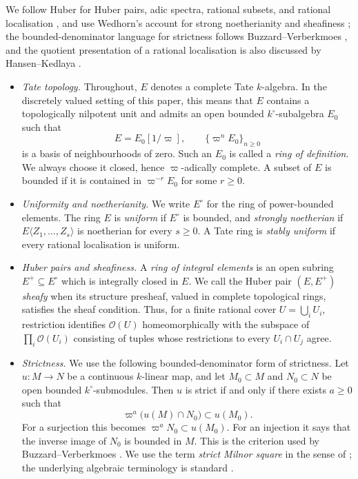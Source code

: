 \documentclass[11pt,reqno]{amsart}
\theoremstyle{definition}
\begin{document}
We follow Huber for Huber pairs, adic spectra, rational subsets, and rational
localisation \cite{Huber94}, and use Wedhorn's account for strong
noetherianity and sheafiness
\cite[Proposition and Definition~6.36, Section~8.1]{Wedhorn}; the
bounded-denominator language for strictness follows Buzzard--Verberkmoes
\cite{BV}, and the quotient presentation of a rational localisation is also
discussed by Hansen--Kedlaya \cite{HK}.

\begin{itemize}
\item \emph{Tate topology.}
Throughout, $E$ denotes a complete Tate $k$-algebra.  In the discretely valued setting of this paper, this means that $E$ contains a topologically nilpotent unit and admits an open bounded $k^\circ$-subalgebra $E_0$ such that
\[
  E=E_0[1/\varpi],
  \qquad
  \{\varpi^nE_0\}_{n\geq0}
\]
is a basis of neighbourhoods of zero.  Such an $E_0$ is called a \emph{ring of definition}.  We always choose it closed, hence $\varpi$-adically complete.  A subset of $E$ is bounded if it is contained in $\varpi^{-r}E_0$ for some $r\geq0$.

\item \emph{Uniformity and noetherianity.}
We write $E^\circ$ for the ring of power-bounded elements.  The ring $E$ is
\emph{uniform} if $E^\circ$ is bounded, and \emph{strongly noetherian} if
$E\langle Z_1,\ldots,Z_s\rangle$ is noetherian for every $s\geq0$.  A Tate ring
is \emph{stably uniform} if every rational localisation is uniform.

\item \emph{Huber pairs and sheafiness.}
A \emph{ring of integral elements} is an open subring
$E^+\subseteq E^\circ$ which is integrally closed in $E$.  We call the Huber pair
$(E,E^+)$ \emph{sheafy} when its structure presheaf, valued in complete
topological rings, satisfies the sheaf condition.  Thus, for a finite rational cover
$U=\bigcup_iU_i$, restriction identifies $\mathcal O(U)$ homeomorphically
with the subspace of $\prod_i\mathcal O(U_i)$ consisting of tuples whose
restrictions to every $U_i\cap U_j$ agree.

\item \emph{Strictness.}
We use the following bounded-denominator form of strictness.  Let $u:M\to N$ be a continuous $k$-linear map, and let $M_0\subset M$ and $N_0\subset N$ be open bounded $k^\circ$-submodules.  Then $u$ is strict if and only if there exists $a\geq0$ such that
\[
  \varpi^a\bigl(u(M)\cap N_0\bigr)\subset u(M_0).
\]
For a surjection this becomes $\varpi^aN_0\subset u(M_0)$.  For an injection it says that the inverse image of $N_0$ is bounded in $M$.  This is the criterion used by Buzzard--Verberkmoes \cite[Lemma~2]{BV}.  We use the term \emph{strict Milnor square} in the sense of ; the underlying algebraic terminology is standard \cite{Milnor,KST}.


\end{itemize}
\end{document}
